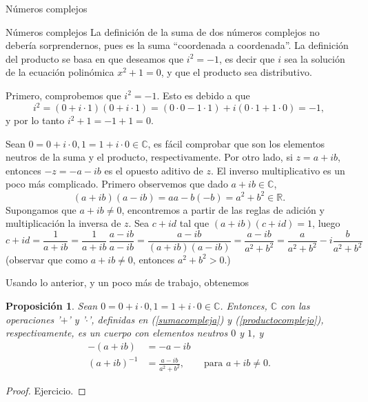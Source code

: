 \documentclass[a4paper,12pt,twoside,spanish,reqno]{amsbook}
\newtheorem{proposicion}[teorema]{Proposici\'on}
\theoremstyle{definition}
\theoremstyle{remark}
\newcommand{\R}{\mathbb R}
\newcommand{\C}{\mathbb C}
\begin{document}
\begin{chapter}{Números complejos}
\begin{section}{Números complejos}
		La definición de la suma de dos números complejos no debería sorprendernos, pues es la suma ``coordenada a coordenada''. La definición del producto se basa en que deseamos que $i^2 = -1$,  es decir que $i$  sea la solución de la ecuación polinómica $x^2 + 1 =0$,   y que el producto sea distributivo. 	
		
		Primero, comprobemos que  $i^2 = -1$. Esto es debido a que
		\begin{equation*}
		i^2 = (0 + i\cdot 1)(0 + i\cdot 1) = (0\cdot 0 - 1 \cdot 1) + i(0\cdot 1 + 1 \cdot 0) = -1,
		\end{equation*} 
		y por lo tanto $i^2 + 1 = -1+1 = 0$.  
		
		
		Sean $0 = 0 + i\cdot 0, 1 = 1 + i\cdot 0 \in \C$,  es fácil comprobar que son los elementos neutros de la suma y el producto,  respectivamente. Por otro lado, si $z = a + ib$,  entonces $-z = -a -ib$ es el opuesto aditivo de $z$. 
		El inverso multiplicativo es un poco más complicado. Primero observemos que dado $a+ib \in \C$,
		\begin{equation*}
		(a+ ib)(a-ib) = aa -b(-b) = a^2 + b^2 \in \R. 
		\end{equation*}
		Supongamos que $a+ib\ne0$,  encontremos  a partir  de las reglas de adición y multiplicación la inversa de $z$. Sea $c+id$ tal que $(a+ib)(c+id)=1$, luego
		\begin{equation*}
		c + id = \frac{1}{a+ib} = \frac{1}{a+ib}\,\frac{a-ib}{a-ib} = \frac{a-ib}{(a+ib)(a-ib)} = 
		\frac{a-ib}{ a^2 + b^2} = \frac{a}{ a^2 + b^2} - i\frac{b}{ a^2 + b^2}
		\end{equation*}  
		(observar que como $a+ib\ne0$,  entonces $a^2 + b^2 >0$.)
		
		Usando lo anterior,  y un poco más de trabajo, obtenemos
		
		\begin{proposicion}
			Sean $0 = 0 + i\cdot 0, 1 = 1 + i\cdot 0\in \C$. Entonces, $\C$ con las operaciones '$+$' y '$\cdot$', definidas en (\ref{sumacompleja}) y (\ref{productocomplejo}),  respectivamente, es un cuerpo con elementos neutros $0$ y $1$, y
			\begin{align*}
			-(a+ib) &= -a -ib \\
			(a+ib)^{-1} &= 	\frac{a-ib}{ a^2 + b^2}, \qquad \text{para $a+ib \ne 0$}.
			\end{align*}
		\end{proposicion}
		\begin{proof}
			Ejercicio.
		\end{proof}
		

\end{section}
\end{chapter}
\end{document}
